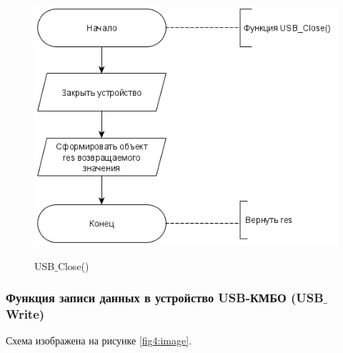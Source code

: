 	\begin{figure}[ph!]
		\centering
		\begin{center}
			{\includegraphics[scale=0.5]{schemes/usb_close.png}}
			\caption{USB$\_$Close()}
			\label{fig3:image}
		\end{center}
	\end{figure}

	\subsubsection{Функция записи данных в устройство USB-КМБО (USB$\_$Write)}

	Схема изображена на рисунке \ref{fig4:image}.
	
